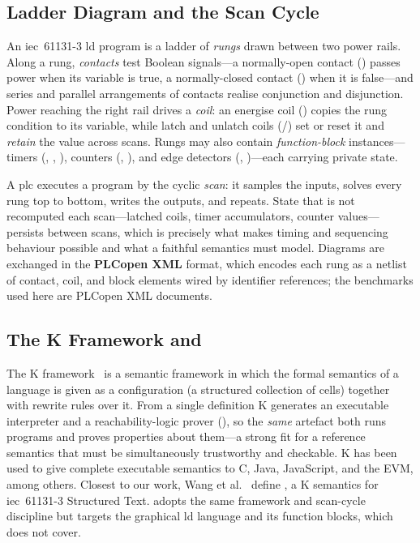 \subsection{Ladder Diagram and the Scan Cycle}
\label{sub:ld}
An \gls{iec}~61131-3 \gls{ld} program is a ladder of \emph{rungs} drawn between
two power rails. Along a rung, \emph{contacts} test Boolean signals---a
normally-open contact () passes power when its variable is true, a
normally-closed contact () when it is false---and series and parallel
arrangements of contacts realise conjunction and disjunction. Power reaching the
right rail drives a \emph{coil}: an energise coil () copies the rung
condition to its variable, while latch and unlatch coils (/)
set or reset it and \emph{retain} the value across scans. Rungs may also contain
\emph{function-block} instances---timers (, , ),
counters (, ), and edge detectors (,
)---each carrying private state.

A \gls{plc} executes a program by the cyclic \emph{scan}: it samples the inputs,
solves every rung top to bottom, writes the outputs, and repeats. State that is
not recomputed each scan---latched coils, timer accumulators, counter values---
persists between scans, which is precisely what makes timing and sequencing
behaviour possible and what a faithful semantics must model. Diagrams are
exchanged in the \textbf{PLCopen XML} format, which encodes each rung as a
netlist of contact, coil, and block elements wired by identifier references; the
benchmarks used here are PLCopen XML documents.

\subsection{The \texorpdfstring{\textsf{K}}{K} Framework and \texorpdfstring{\kst{}}{K-ST}}
\label{sub:kframework}
The \textsf{K} framework~\cite{Rosu2010k} is a semantic framework in which the
formal semantics of a language is given as a configuration (a structured
collection of cells) together with rewrite rules over it. From a single
definition \textsf{K} generates an executable interpreter and a reachability-logic
prover (), so the \emph{same} artefact both runs programs and proves
properties about them---a strong fit for a reference semantics that must be
simultaneously trustworthy and checkable. \textsf{K} has been used to give
complete executable semantics to C, Java, JavaScript, and the EVM, among others.
Closest to our work, Wang et al.~\cite{Wang2023} define \kst{}, a \textsf{K}
semantics for \gls{iec}~61131-3 Structured Text. \kld{} adopts the same framework
and scan-cycle discipline but targets the graphical \gls{ld} language and its
function blocks, which \kst{} does not cover.

